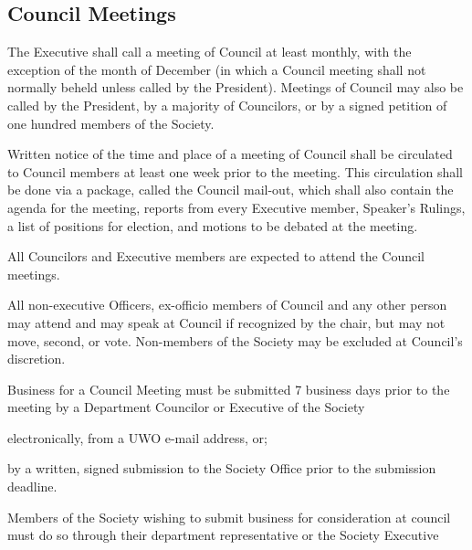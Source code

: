 \subsection{Council Meetings}
\begin{longenum}[ label*=\thesubsection.\arabic*., align=left]
	\item The Executive shall call a meeting of Council at least monthly, with the exception of the month of December (in which a Council meeting shall not normally beheld unless called by the President).  Meetings of Council may also be called by the President, by a majority of Councilors, or by a signed petition of one hundred members of the Society.
    \item Written notice of the time and place of a meeting of Council shall be circulated to Council members at least one week prior to the meeting. This circulation shall be done via a package, called the Council mail-out, which shall also contain the agenda for the meeting, reports from every Executive member, Speaker's Rulings, a list of positions for election, and motions to be debated at the meeting.
    \item All Councilors and Executive members are expected to attend the Council meetings. 
    \item All non-executive Officers, ex-officio members of Council and any other person may attend and may speak at Council if recognized by the chair, but may not move, second, or vote. Non-members of the Society may be excluded at Council's discretion. 
    \item Business for a Council Meeting must be submitted 7 business days prior to the meeting by a Department Councilor or Executive of the Society
	\begin{longenum}[ label*=\arabic*., align=left]
		\item electronically, from a UWO e-mail address, or;
        \item by a written, signed submission to the Society Office prior to the submission deadline.
     \end{longenum}
    \item Members of the Society wishing to submit business for consideration at council must do so through their department representative or the Society Executive
    

\end{longenum}
